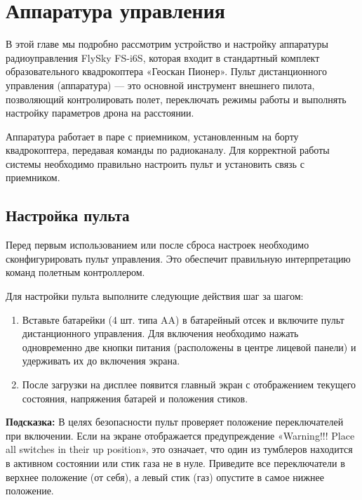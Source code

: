\section{Аппаратура управления}

В этой главе мы подробно рассмотрим устройство и настройку аппаратуры радиоуправления FlySky FS-i6S, которая входит в стандартный комплект образовательного квадрокоптера «Геоскан Пионер». Пульт дистанционного управления (аппаратура) — это основной инструмент внешнего пилота, позволяющий контролировать полет, переключать режимы работы и выполнять настройку параметров дрона на расстоянии.

Аппаратура работает в паре с приемником, установленным на борту квадрокоптера, передавая команды по радиоканалу. Для корректной работы системы необходимо правильно настроить пульт и установить связь с приемником.

\subsection{Настройка пульта}

Перед первым использованием или после сброса настроек необходимо сконфигурировать пульт управления. Это обеспечит правильную интерпретацию команд полетным контроллером.

Для настройки пульта выполните следующие действия шаг за шагом:

\begin{enumerate}
    \item Вставьте батарейки (4 шт. типа AA) в батарейный отсек и включите пульт дистанционного управления. Для включения необходимо нажать одновременно две кнопки питания (расположены в центре лицевой панели) и удерживать их до включения экрана.
    \item После загрузки на дисплее появится главный экран с отображением текущего состояния, напряжения батарей и положения стиков.
\end{enumerate}

\begin{hintbox}
    \textbf{Подсказка:} В целях безопасности пульт проверяет положение переключателей при включении. Если на экране отображается предупреждение «Warning!!! Place all switches in their up position», это означает, что один из тумблеров находится в активном состоянии или стик газа не в нуле. Приведите все переключатели в верхнее положение (от себя), а левый стик (газ) опустите в самое нижнее положение.
\end{hintbox}

